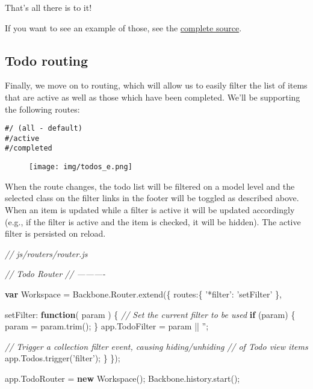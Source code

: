 \documentclass[9pt]{book}
\newenvironment{Shaded}{}{}
\newcommand{\KeywordTok}[1]{\textcolor[rgb]{0.00,0.44,0.13}{\textbf{{#1}}}}
\newcommand{\DataTypeTok}[1]{\textcolor[rgb]{0.56,0.13,0.00}{{#1}}}
\newcommand{\StringTok}[1]{\textcolor[rgb]{0.25,0.44,0.63}{{#1}}}
\newcommand{\CommentTok}[1]{\textcolor[rgb]{0.38,0.63,0.69}{\textit{{#1}}}}
\newcommand{\OtherTok}[1]{\textcolor[rgb]{0.00,0.44,0.13}{{#1}}}
\newcommand{\FunctionTok}[1]{\textcolor[rgb]{0.02,0.16,0.49}{{#1}}}
\newcommand{\NormalTok}[1]{{#1}}
\begin{document}
That's all there is to it!

If you want to see an example of those, see the
\href{https://github.com/tastejs/todomvc/tree/gh-pages/architecture-examples/backbone}{complete
source}.

\subsection{Todo routing}\label{todo-routing}

Finally, we move on to routing, which will allow us to easily filter the
list of items that are active as well as those which have been
completed. We'll be supporting the following routes:

\begin{verbatim}
#/ (all - default)
#/active
#/completed
\end{verbatim}

\begin{figure}[htbp]
\centering
\texttt{[image: img/todos\_e.png]}
\end{figure}

When the route changes, the todo list will be filtered on a model level
and the selected class on the filter links in the footer will be toggled
as described above. When an item is updated while a filter is active it
will be updated accordingly (e.g., if the filter is active and the item
is checked, it will be hidden). The active filter is persisted on
reload.

\begin{Shaded}
\begin{Highlighting}[]

  \CommentTok{// js/routers/router.js}

  \CommentTok{// Todo Router}
  \CommentTok{// ----------}

  \KeywordTok{var} \NormalTok{Workspace = }\OtherTok{Backbone}\NormalTok{.}\OtherTok{Router}\NormalTok{.}\FunctionTok{extend}\NormalTok{(\{}
    \DataTypeTok{routes}\NormalTok{:\{}
      \StringTok{'*filter'}\NormalTok{: }\StringTok{'setFilter'}
    \NormalTok{\},}

    \DataTypeTok{setFilter}\NormalTok{: }\KeywordTok{function}\NormalTok{( param ) \{}
      \CommentTok{// Set the current filter to be used}
      \KeywordTok{if} \NormalTok{(param) \{}
        \NormalTok{param = }\OtherTok{param}\NormalTok{.}\FunctionTok{trim}\NormalTok{();}
      \NormalTok{\}}
      \OtherTok{app}\NormalTok{.}\FunctionTok{TodoFilter} \NormalTok{= param || }\StringTok{''}\NormalTok{;}

      \CommentTok{// Trigger a collection filter event, causing hiding/unhiding}
      \CommentTok{// of Todo view items}
      \OtherTok{app}\NormalTok{.}\OtherTok{Todos}\NormalTok{.}\FunctionTok{trigger}\NormalTok{(}\StringTok{'filter'}\NormalTok{);}
    \NormalTok{\}}
  \NormalTok{\});}

  \OtherTok{app}\NormalTok{.}\FunctionTok{TodoRouter} \NormalTok{= }\KeywordTok{new} \FunctionTok{Workspace}\NormalTok{();}
  \OtherTok{Backbone}\NormalTok{.}\OtherTok{history}\NormalTok{.}\FunctionTok{start}\NormalTok{();}
\end{Highlighting}
\end{Shaded}
\end{document}
